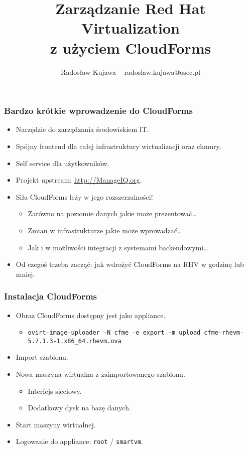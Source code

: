 \documentclass[dvipsnames,table]{beamer}
\title{Zarządzanie Red Hat Virtualization \\ z użyciem CloudForms}
\author{Radosław Kujawa -- radoslaw.kujawa@osec.pl}
\institute{OSEC}
\begin{document}
\begin{frame}
	\titlepage
\end{frame}

\begin{frame}
\frametitle{Bardzo krótkie wprowadzenie do CloudForms}
\begin{itemize}
	\item Narzędzie do zarządzania środowiskiem IT.
	\item Spójny frontend dla całej infrastruktury wirtualizacji oraz chmury. 
	\item Self service dla użytkowników.
	\item Projekt upstream: \url{http://ManageIQ.org}.
	\item Siła CloudForms leży w jego rozszerzalności!
	\begin{itemize}
		\item Zarówno na poziomie danych jakie może prezentować\ldots
		\item Zmian w infrastrukturze jakie może wprowadzać\ldots
		\item Jak i w możliwości integracji z systemami backendowymi\ldots
	\end{itemize}	
	\item Od czegoś trzeba zacząć: jak wdrożyć CloudForms na RHV w godzinę lub mniej. \Smiley 
\end{itemize}
\end{frame}

\begin{frame}
\frametitle{Instalacja CloudForms}
\begin{itemize}
	\item Obraz CloudForms dostępny jest jako appliance.
	\begin{itemize}
		\item {\tt ovirt-image-uploader -N cfme -e export -m upload cfme-rhevm-5.7.1.3-1.x86\_64.rhevm.ova}
	\end{itemize}
	\item Import szablonu.
	\item Nowa maszyna wirtualna z zaimportowanego szablonu.
	\begin{itemize}
		\item Interfejs sieciowy.
		\item Dodatkowy dysk na bazę danych.
	\end{itemize}
	\item Start maszyny wirtualnej.
	\item Logowanie do appliance: {\tt root} / {\tt smartvm}.
\end{itemize}
\end{frame}
\end{document}
